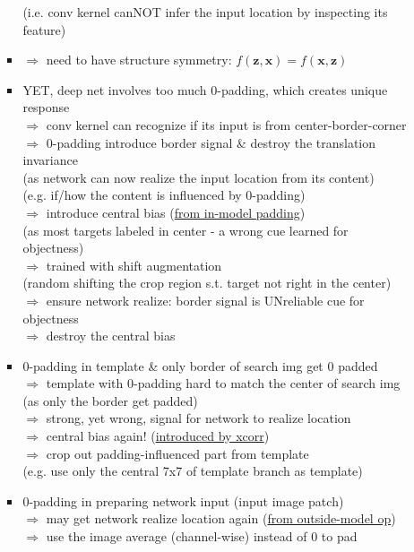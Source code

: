 \begin{itemize}
\begin{itemize}
\begin{itemize}
		(i.e. conv kernel canNOT infer the input location by inspecting its feature)
		\item $\Rightarrow$ need to have structure symmetry: $f(\mathbf z, \mathbf x) = f(\mathbf x, \mathbf z)$
		\item YET, deep net involves too much $0$-padding, which creates unique response \\
		$\Rightarrow$ conv kernel can recognize if its input is from center-border-corner \\
		$\Rightarrow$ $0$-padding introduce border signal \& destroy the translation invariance \\
		(as network can now realize the input location from its content) \\
		(e.g. if/how the content is influenced by $0$-padding) \\
		$\Rightarrow$ introduce central bias (\underline{from in-model padding}) \\
		(as most targets labeled in center - a wrong cue learned for objectness) \\
		$\Rightarrow$ trained with shift augmentation \\ 
		(random shifting the crop region s.t. target not right in the center) \\
		$\Rightarrow$ ensure network realize: border signal is UNreliable cue for objectness \\
		$\Rightarrow$ destroy the central bias
		\item $0$-padding in template \& only border of search img get $0$ padded \\
		$\Rightarrow$ template with $0$-padding hard to match the center of search img \\
		(as only the border get padded) \\
		$\Rightarrow$ strong, yet wrong, signal for network to realize location \\
		$\Rightarrow$ central bias again! (\underline{introduced by xcorr}) \\
		$\Rightarrow$ crop out padding-influenced part from template \\
		(e.g. use only the central 7x7 of template branch as template)
		\item $0$-padding in preparing network input (input image patch) \\
		$\Rightarrow$ may get network realize location again (\underline{from outside-model op}) \\
		$\Rightarrow$ use the image average (channel-wise) instead of $0$ to pad
		\end{itemize}

\end{itemize}
\end{itemize}
